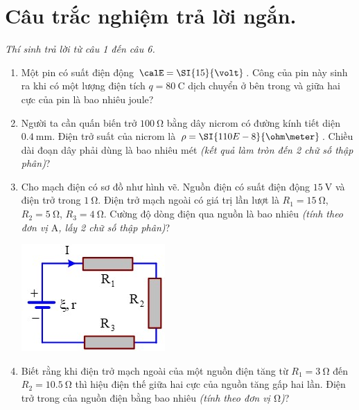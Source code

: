 \section{Câu trắc nghiệm trả lời ngắn.} \textit{Thí sinh trả lời từ câu 1 đến câu 6.}
\begin{enumerate}[label=\bfseries Câu \arabic*:]
	\item Một pin có suất điện động $\calE=\SI{15}{\volt}$. Công của pin này sinh ra khi có một lượng điện tích $q=\SI{80}{\coulomb}$ dịch chuyển ở bên trong và giữa hai cực của pin là bao nhiêu joule?

\item Người ta cần quấn biến trở $\SI{100}{\ohm}$ bằng dây nicrom có đường kính tiết diện $\SI{0.4}{\milli\meter}$. Điện trở suất của nicrom là $\rho=\SI{110E-8}{\ohm\meter}$. Chiều dài đoạn dây phải dùng là bao nhiêu mét \textit{(kết quả làm tròn đến 2 chữ số thập phân)}?

\item Cho mạch điện có sơ đồ như hình vẽ. Nguồn điện có suất điện động $\SI{15}{\volt}$ và điện trở trong $\SI{1}{\ohm}$. Điện trở mạch ngoài có giá trị lần lượt là $R_1=\SI{15}{\ohm}$, $R_2=\SI{5}{\ohm}$, $R_3=\SI{4}{\ohm}$. Cường độ dòng điện qua nguồn là bao nhiêu \textit{(tính theo đơn vị $\si{\ampere}$, lấy 2 chữ số thập phân)}?
\begin{center}
	\includegraphics[width=0.25\linewidth]{../figs/PH11-FinalSem2-01-7}
\end{center}

	\item Biết rằng khi điện trở mạch ngoài của một nguồn điện tăng từ $R_1=\SI{3}{\ohm}$ đến $R_2=\SI{10.5}{\ohm}$ thì hiệu điện thế giữa hai cực của nguồn tăng gấp hai lần. Điện trở trong của nguồn điện bằng bao nhiêu \textit{(tính theo đơn vị $\si{\ohm}$)}?


\end{enumerate}
